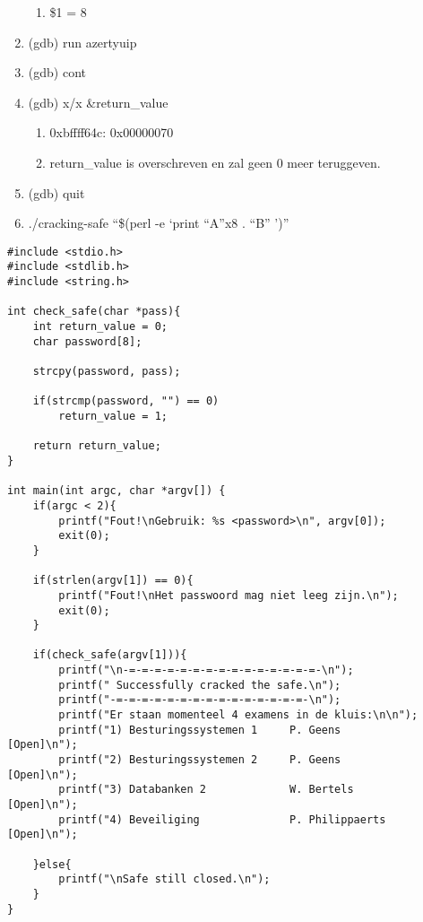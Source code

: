 \begin{enumerate}
\begin{enumerate}
  		\item \$1 = 8
  		\end{enumerate}
  	\item (gdb) run azertyuip
  	\item (gdb) cont
  	\item (gdb) x/x \&return\_value
  		\begin{enumerate}
  		\item 0xbffff64c: 0x00000070
  		\item return\_value is overschreven en zal geen 0 meer teruggeven.
  		\end{enumerate}
  	\item (gdb) quit
  	\item ./cracking-safe ``\$(perl -e `print ``A''x8 . ``B'' ')''
\end{enumerate}

\begin{lstlisting}
#include <stdio.h>
#include <stdlib.h>
#include <string.h>

int check_safe(char *pass){
	int return_value = 0;
	char password[8];

	strcpy(password, pass);

	if(strcmp(password, "") == 0)
		return_value = 1;

	return return_value;
}

int main(int argc, char *argv[]) {
	if(argc < 2){
		printf("Fout!\nGebruik: %s <password>\n", argv[0]);
		exit(0);
	}

	if(strlen(argv[1]) == 0){
		printf("Fout!\nHet passwoord mag niet leeg zijn.\n");
		exit(0);
	}

	if(check_safe(argv[1])){
		printf("\n-=-=-=-=-=-=-=-=-=-=-=-=-=-=-=-\n");
		printf(" Successfully cracked the safe.\n");
		printf("-=-=-=-=-=-=-=-=-=-=-=-=-=-=-=-\n");
		printf("Er staan momenteel 4 examens in de kluis:\n\n");
		printf("1) Besturingssystemen 1     P. Geens          [Open]\n");
		printf("2) Besturingssystemen 2     P. Geens          [Open]\n");
		printf("3) Databanken 2             W. Bertels        [Open]\n");
		printf("4) Beveiliging              P. Philippaerts   [Open]\n");

	}else{
		printf("\nSafe still closed.\n");
	}
}
\end{lstlisting}